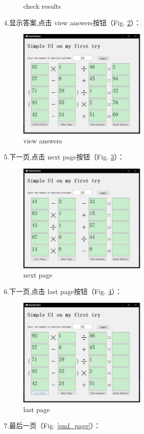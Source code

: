 \documentclass[10pt,journal,compsoc,fleqn]{IEEEtran}
\begin{document}
\begin{CJK}{UTF8}{song}
\begin{figure}[H]
  \caption{check results}
  \label{check_rst}
\end{figure}
\noindent 4.显示答案,点击 view answers按钮（Fig. \ref{view_asw}）：
\begin{figure}[H]
  \centering
  \includegraphics[width=2.5in]{./figures/view_asw.pdf}
  \caption{view answers}
  \label{view_asw}
\end{figure}
\noindent 5.下一页,点击 next page按钮（Fig. \ref{next_page}）：
\begin{figure}[H]
  \centering
  \includegraphics[width=2.5in]{./figures/next_page.pdf}
  \caption{next page}
  \label{next_page}
\end{figure}
\noindent 6.下一页,点击 last page按钮（Fig. \ref{last_page}）：
\begin{figure}[H]
  \centering
  \includegraphics[width=2.5in]{./figures/last_page.pdf}
  \caption{last page}
  \label{last_page}
\end{figure}
\noindent 7.最后一页（Fig. \ref{end_page}）：

\end{CJK}
\end{document}
